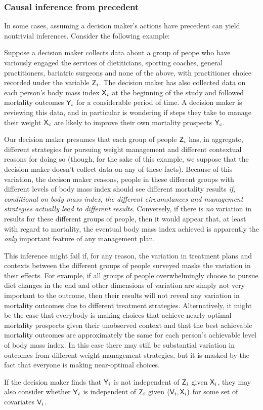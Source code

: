 \subsubsection{Causal inference from precedent}

In some cases, assuming a decision maker's actions have precedent can yield nontrivial inferences. Consider the following example:

\begin{example}\label{ex:doctor_precedent}
Suppose a decision maker collects data about a group of peope who have variously engaged the services of dietiticians, sporting coaches, general practitioners, bariatric surgeons and none of the above, with practitioner choice recorded under the variable $\mathsf{Z}_i$. The decision maker has also collected data on each person's body mass index $\mathsf{X}_i$ at the beginning of the study and followed mortality outcomes $\mathsf{Y}_i$ for a considerable period of time. A decision maker is reviewing this data, and in particular is wondering if steps they take to manage their weight $\mathsf{X}_c$ are likely to improve their own mortality prospects $\mathsf{Y}_c$.

Our decision maker presumes that each group of people $\mathsf{Z}_i$ has, in aggregate, different strategies for pursuing weight management and different contextual reasons for doing so (though, for the sake of this example, we suppose that the decision maker doesn't collect data on any of these facts). Because of this variation, the decison maker reasons, people in these different groups with different levels of body mass index should see different mortality results \emph{if, conditional on body mass index, the different circumstances and management strategies actually lead to different results}. Conversely, if there is \emph{no} variation in results for these different groups of people, then it would appear that, at least with regard to mortality, the eventual body mass index achieved is apparently the \emph{only} important feature of any management plan.

This inference might fail if, for any reason, the variation in treatment plans and contexts between the different groups of people surveyed masks the variation in their effects. For example, if all groups of people overwhelmingly choose to pursue diet changes in the end and other dimensions of variation are simply not very important to the outcome, then their results will not reveal any variation in mortality outcomes due to different treatment strategies. Alternatively, it might be the case that everybody is making choices that achieve nearly optimal mortality prospects given their unobserved context and that the best achievable mortality outcomes are approximately the same for each person's achievable level of body mass index. In this case there may still be substantial variation in outcomes from different weight management strategies, but it is masked by the fact that everyone is making near-optimal choices.

If the decision maker finds that $\mathsf{Y}_i$ is not independent of $\mathsf{Z}_i$ given $\mathsf{X}_i$, they may also consider whether $\mathsf{Y}_i$ is independent of $\mathsf{Z}_i$ given $(\mathsf{V}_i,\mathsf{X}_i)$ for some set of covariates $\mathsf{V}_i$.
\end{example}

